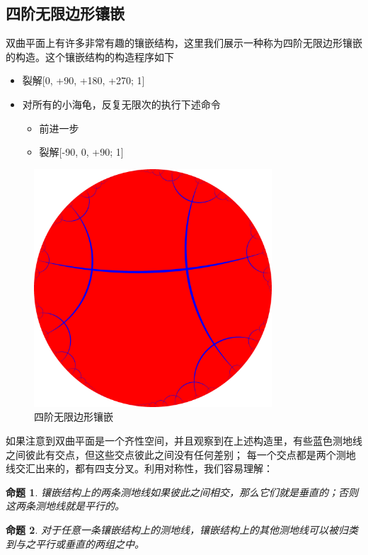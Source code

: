 \documentclass[a4paper,12pt]{article}
\newtheorem{proposition}{命题}
\begin{document}
\subsection{四阶无限边形镶嵌}

双曲平面上有许多非常有趣的镶嵌结构，这里我们展示一种称为四阶无限边形镶嵌的构造。这个镶嵌结构的构造程序如下

\begin{itemize}
\item 裂解[0, +90, +180, +270; 1]
\item 对所有的小海龟，反复无限次的执行下述命令
\begin{itemize}\item 前进一步 \item 裂解[-90, 0, +90; 1] \end{itemize}
\end{itemize}


\begin{figure}[ht]
\centering
\includegraphics[width=3.5in]{images/H2_tiling_24i-1.png}
\caption{四阶无限边形镶嵌}
\end{figure}

如果注意到双曲平面是一个齐性空间，并且观察到在上述构造里，有些蓝色测地线之间彼此有交点，但这些交点彼此之间没有任何差别；
每一个交点都是两个测地线交汇出来的，都有四支分叉。利用对称性，我们容易理解：

\begin{proposition}
\label{A}
镶嵌结构上的两条测地线如果彼此之间相交，那么它们就是垂直的；否则这两条测地线就是平行的。
\end{proposition}

\begin{proposition}
\label{B}
对于任意一条镶嵌结构上的测地线，镶嵌结构上的其他测地线可以被归类到与之平行或垂直的两组之中。
\end{proposition}
\end{document}
